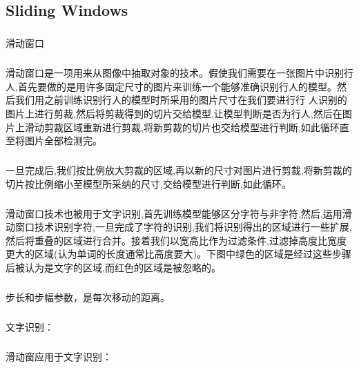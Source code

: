 \documentclass{article}
\begin{document}
\begin{CJK}{UTF8}{gbsn}
\subsection{Sliding Windows}
\subparagraph{}
滑动窗口
\subparagraph{}
滑动窗口是一项用来从图像中抽取对象的技术。假使我们需要在一张图片中识别行人,首先要做的是用许多固定尺寸的图片来训练一个能够准确识别行人的模型。然后我们用之前训练识别行人的模型时所采用的图片尺寸在我们要进行行 人识别的图片上进行剪裁,然后将剪裁得到的切片交给模型,让模型判断是否为行人,然后在图片上滑动剪裁区域重新进行剪裁,将新剪裁的切片也交给模型进行判断,如此循环直至将图片全部检测完。
\subparagraph{}
一旦完成后,我们按比例放大剪裁的区域,再以新的尺寸对图片进行剪裁,将新剪裁的切片按比例缩小至模型所采纳的尺寸,交给模型进行判断,如此循环。
\subparagraph{}
滑动窗口技术也被用于文字识别,首先训练模型能够区分字符与非字符,然后,运用滑动窗口技术识别字符,一旦完成了字符的识别,我们将识别得出的区域进行一些扩展,然后将重叠的区域进行合并。接着我们以宽高比作为过滤条件,过滤掉高度比宽度更大的区域(认为单词的长度通常比高度要大)。下图中绿色的区域是经过这些步骤后被认为是文字的区域,而红色的区域是被忽略的。
\begin{figure}[H]
\label{fig:2207}
\end{figure}
\begin{figure}[H]
\label{fig:2208}
\end{figure}
\subparagraph{}
步长和步幅参数，是每次移动的距离。
\begin{figure}[H]
\label{fig:2209}
\end{figure}
\subparagraph{}
文字识别：
\begin{figure}[H]
\label{fig:2210}
\end{figure}
\subparagraph{}
滑动窗应用于文字识别：
\begin{figure}[H]
\label{fig:2212}
\end{figure}
\subparagraph{}

\end{CJK}
\end{document}
